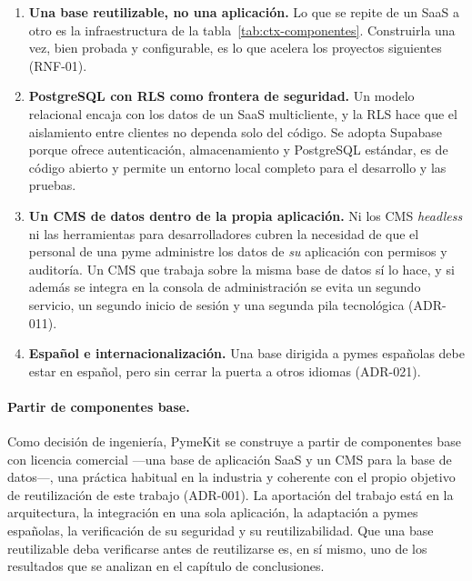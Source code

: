 \begin{enumerate}
  \item \textbf{Una base reutilizable, no una aplicación.} Lo que se repite
        de un SaaS a otro es la infraestructura de la
        tabla~\ref{tab:ctx-componentes}. Construirla una vez, bien probada y
        configurable, es lo que acelera los proyectos siguientes (RNF-01).
  \item \textbf{PostgreSQL con RLS como frontera de seguridad.} Un modelo
        relacional encaja con los datos de un SaaS multicliente, y la RLS hace
        que el aislamiento entre clientes no dependa solo del código. Se
        adopta Supabase porque ofrece autenticación, almacenamiento y
        PostgreSQL estándar, es de código abierto y permite un entorno local
        completo para el desarrollo y las pruebas.
  \item \textbf{Un CMS de datos dentro de la propia aplicación.} Ni los CMS
        \textit{headless} ni las herramientas para desarrolladores cubren la
        necesidad de que el personal de una pyme administre los datos de
        \emph{su} aplicación con permisos y auditoría. Un CMS que trabaja
        sobre la misma base de datos sí lo hace, y si además se integra en la
        consola de administración se evita un segundo servicio, un segundo
        inicio de sesión y una segunda pila tecnológica (ADR-011).
  \item \textbf{Español e internacionalización.} Una base dirigida a pymes
        españolas debe estar en español, pero sin cerrar la puerta a otros
        idiomas (ADR-021).
\end{enumerate}

\paragraph{Partir de componentes base.}
Como decisión de ingeniería, PymeKit se construye a partir de componentes base
con licencia comercial ---una base de aplicación SaaS y un CMS para la base de
datos---, una práctica habitual en la industria y coherente con el propio
objetivo de reutilización de este trabajo (ADR-001). La aportación del trabajo
está en la arquitectura, la integración en una sola aplicación, la adaptación
a pymes españolas, la verificación de su seguridad y su reutilizabilidad. Que una base reutilizable deba verificarse
antes de reutilizarse es, en sí mismo, uno de los resultados que se analizan en
el capítulo de conclusiones.
